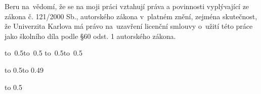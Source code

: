 \medskip\noindent
Beru na~vědomí, že se na moji práci vztahují práva a povinnosti vyplývající
ze zákona č. 121/2000 Sb., autorského zákona v~platném znění, zejména skutečnost,
že Univerzita Karlova má právo na~uzavření licenční smlouvy o~užití této
práce jako školního díla podle §60 odst. 1 autorského zákona.

\vspace{10mm}

\hbox{\hbox to 0.5\hbox to 0.5\hsize{\dotfill\quad}}
\smallskip
\hbox{\hbox to 0.5\hsize{}\hbox to 0.5}

\vspace{20mm}
\newpage


\openright

\noindent

\newpage


\openright

\vbox to 0.5\nobreak\vbox to 0.49\vsize{
\setlength\parindent{0mm}
\setlength\parskip{5mm}

\vss}

\newpage


\openright

\vbox to 0.5

\newpage



\openright
\pagestyle{plain}
\setcounter{page}{1}
